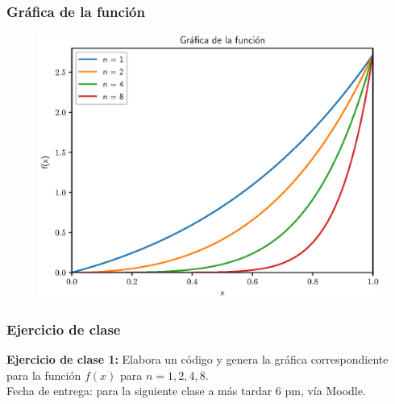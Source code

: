 \documentclass[12pt]{beamer}
\begin{document}
\begin{frame}
\frametitle{Gráfica de la función}
\begin{figure}
	\centering
	\includegraphics[scale=0.6]{Imagenes/Estabilidad_02.eps}
\end{figure}
\end{frame}
\begin{frame}
\frametitle{Ejercicio de clase}
\textbf{Ejercicio de clase 1:} Elabora un código y genera la gráfica correspondiente para la función $f(x)$ para $n = 1, 2, 4, 8$.
\\
\bigskip
\pause
Fecha de entrega: para la siguiente clase a más tardar 6 pm, vía Moodle.
\end{frame}




\end{document}
